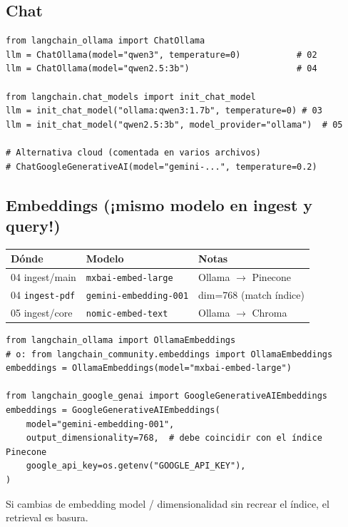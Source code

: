 \documentclass[11pt,a4paper]{article}
\begin{document}
\subsection{Chat}
\begin{lstlisting}
from langchain_ollama import ChatOllama
llm = ChatOllama(model="qwen3", temperature=0)           # 02
llm = ChatOllama(model="qwen2.5:3b")                     # 04

from langchain.chat_models import init_chat_model
llm = init_chat_model("ollama:qwen3:1.7b", temperature=0) # 03
llm = init_chat_model("qwen2.5:3b", model_provider="ollama")  # 05

# Alternativa cloud (comentada en varios archivos)
# ChatGoogleGenerativeAI(model="gemini-...", temperature=0.2)
\end{lstlisting}

\subsection{Embeddings (¡mismo modelo en ingest y query!)}
\begin{center}
\begin{tabular}{@{}llp{5.8cm}@{}}
\toprule
\textbf{Dónde} & \textbf{Modelo} & \textbf{Notas} \\
\midrule
04 ingest/main & \texttt{mxbai-embed-large} & Ollama $\to$ Pinecone \\
04 \texttt{ingest-pdf} & \texttt{gemini-embedding-001} & dim=768 (match índice) \\
05 ingest/core & \texttt{nomic-embed-text} & Ollama $\to$ Chroma \\
\bottomrule
\end{tabular}
\end{center}

\begin{lstlisting}
from langchain_ollama import OllamaEmbeddings
# o: from langchain_community.embeddings import OllamaEmbeddings
embeddings = OllamaEmbeddings(model="mxbai-embed-large")

from langchain_google_genai import GoogleGenerativeAIEmbeddings
embeddings = GoogleGenerativeAIEmbeddings(
    model="gemini-embedding-001",
    output_dimensionality=768,  # debe coincidir con el índice Pinecone
    google_api_key=os.getenv("GOOGLE_API_KEY"),
)
\end{lstlisting}

\begin{warn}
Si cambias de embedding model / dimensionalidad sin recrear el índice, el retrieval es basura.
\end{warn}
\end{document}
